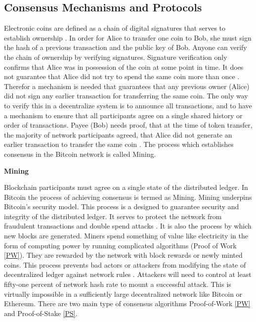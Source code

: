 \subsection{Consensus Mechanisms and Protocols} \label{Mining} 
Electronic coins are defined as a chain of digital signatures that serves to establish ownership \cite{paper:001}. In order for Alice to transfer one coin to Bob, she must sign the hash of a previous transaction and the public key of Bob. Anyone can verify the chain of ownership by verifying signatures. Signature verification only confirms that Alice was in possession of the coin at some point in time. It does not guarantee that Alice did not try to spend the same coin more than once \cite{paper:001}. Therefor a mechanism is needed that guarantees that any previous owner (Alice) did not sign any earlier transaction for transferring the same coin. The only way to verify this in a decentralize system is to announce all transactions, and to have a mechanism to ensure that all participants agree on a single shared history or order of transactions. Payee (Bob) needs proof, that at the time of token transfer, the majority of network participants agreed, that Alice did not generate an earlier transaction to transfer the same coin \cite{paper:001}. The process which establishes consensus in the Bitcoin network is called Mining.

\textbf{Mining}

Blockchain participants must agree on a single state of the distributed ledger. In Bitcoin the process of achieving consensus is termed as Mining. Mining underpins Bitcoin’s security model. This process is a designed to guarantee security and integrity of the distributed ledger. It serves to protect the network from fraudulent transactions and double spend attacks \cite{paper:001}. It is also the process by which new blocks are generated. Miners spend something of value like electricity in the form of computing power by running complicated algorithms (Proof of Work \ref{PW}). They are rewarded by the network with block rewards or newly minted coins. This process prevents bad actors or attackers from modifying the state of decentralized ledger against network rules \cite{paper:001}. Attackers will need to control at least fifty-one percent of network hash rate to mount a successful attack. This is virtually impossible in a sufficiently large decentralized network like Bitcoin or Ethereum. There are two main type of consensus algorithms Proof-of-Work \ref{PW} and Proof-of-Stake \ref{PS}.
\vspace{0.5cm}  
